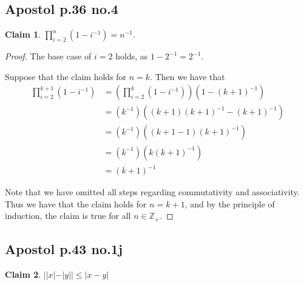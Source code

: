 \documentclass[12pt,letterpaper]{article}
\theoremstyle{definition}
\newtheorem*{claim}{Claim}
\newcommand{\Z}{\mathbb{Z}}
\begin{document}
\subsection*{Apostol p.36 no.4}

\begin{claim}
    $\prod_{i=2}^{n}(1 - i^{-1}) = n^{-1}$.
\end{claim}

\begin{proof}
    The base case of $i = 2$ holds, as $1 - 2^{-1} = 2^{-1}$.
    
    Suppose that the claim holds for $n = k$.
    Then we have that
    \begin{align*}
        \prod_{i=2}^{k+1}(1 - i^{-1}) &= (\prod_{i=2}^{k}(1 - i^{-1}))(1 - (k+1)^{-1}) \\
        &= (k^{-1})((k+1)(k+1)^{-1} - (k+1)^{-1}) \\
        &= (k^{-1})((k+1-1)(k+1)^{-1}) \\
        &= (k^{-1})(k(k+1)^{-1}) \\
        &= (k+1)^{-1}
    \end{align*}

    Note that we have omitted all steps regarding commutativity and associativity.
    Thus we have that the claim holds for $n = k+1$, and by the principle of induction,
    the claim is true for all $n \in \Z_+$. 
\end{proof}

\subsection*{Apostol p.43 no.1j}

\begin{claim}
    $||x| - |y|| \leq |x - y|$
\end{claim}
\end{document}
